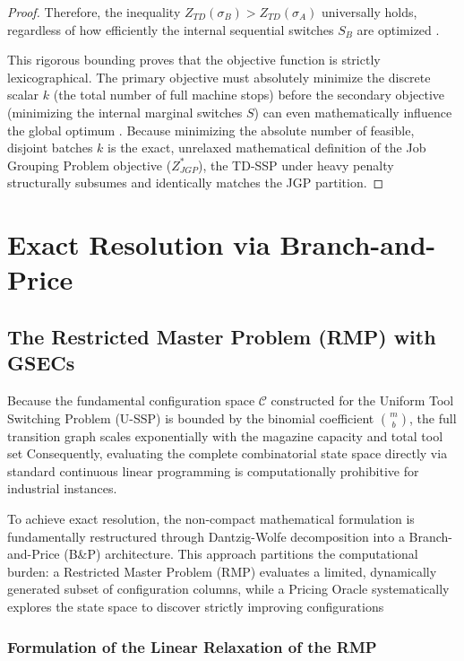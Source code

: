 \documentclass[11pt, a4paper]{book}
\begin{document}
\begin{proof}
		Therefore, the inequality $Z_{TD}(\sigma_B) > Z_{TD}(\sigma_A)$ universally holds, regardless of how efficiently the internal sequential switches $S_B$ are optimized %
		. 
		
		This rigorous bounding proves that the objective function is strictly lexicographical. The primary objective must absolutely minimize the discrete scalar $k$ (the total number of full machine stops) before the secondary objective (minimizing the internal marginal switches $S$) can even mathematically influence the global optimum %
		. Because minimizing the absolute number of feasible, disjoint batches $k$ is the exact, unrelaxed mathematical definition of the Job Grouping Problem objective ($Z_{JGP}^*$), the TD-SSP under heavy penalty structurally subsumes and identically matches the JGP partition.
	\end{proof}
	
	
	\chapter{Exact Resolution via Branch-and-Price}
	
	\section{The Restricted Master Problem (RMP) with GSECs}
	
	Because the fundamental configuration space $\mathcal{C}$ constructed for the Uniform Tool Switching Problem (U-SSP) is bounded by the binomial coefficient $\binom{m}{b}$, the full transition graph scales exponentially with the magazine capacity and total tool set %
	Consequently, evaluating the complete combinatorial state space directly via standard continuous linear programming is computationally prohibitive for industrial instances. 
	
	To achieve exact resolution, the non-compact mathematical formulation is fundamentally restructured through Dantzig-Wolfe decomposition into a Branch-and-Price (B\&P) architecture. This approach partitions the computational burden: a Restricted Master Problem (RMP) evaluates a limited, dynamically generated subset of configuration columns, while a Pricing Oracle systematically explores the state space to discover strictly improving configurations %
	
	\subsection{Formulation of the Linear Relaxation of the RMP}
	
\end{document}
